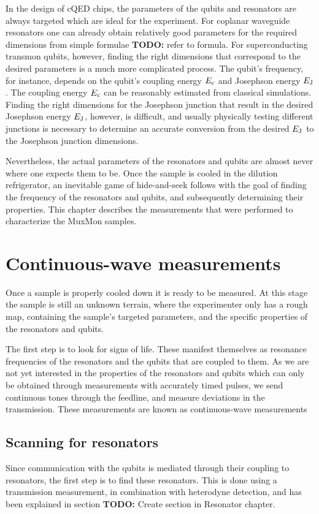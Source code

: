     In the design of cQED chips, the parameters of the qubits and resonators are always targeted which are ideal for the experiment.
    For coplanar waveguide resonators one can already obtain relatively good parameters for the required dimensions from simple formulae \textbf{TODO:} refer to formula.
    For superconducting transmon qubits, however, finding the right dimensions that correspond to the desired parameters is a much more complicated process.
    The qubit's frequency, for instance, depends on the qubit's coupling energy $E_\text{c}$ and Josephson energy $E_\text{J}$. The coupling energy $E_\text{c}$ can be reasonably estimated from classical simulations. Finding the right dimensions for the Josephson junction that result in the desired Josephson energy $E_\text{J}$, however, is difficult, and usually physically testing different junctions is necessary to determine an accurate conversion from the desired $E_\text{J}$ to the Josephson junction dimensions.

    Nevertheless, the actual parameters of the resonators and qubits are almost never where one expects them to be. Once the sample is cooled in the dilution refrigerator, an inevitable game of hide-and-seek follows with the goal of finding the frequency of the resonators and qubits, and subsequently determining their properties. This chapter describes the measurements that were performed to characterize the MuxMon samples.

    \section{Continuous-wave measurements}

      Once a sample is properly cooled down it is ready to be measured. At this stage the sample is still an unknown terrain, where the experimenter only has a rough map, containing the sample's targeted parameters, and the specific properties of the resonators and qubits.

      The first step is to look for signs of life. These manifest themselves as resonance frequencies of the resonators and the qubits that are coupled to them. As we are not yet interested in the properties of the resonators and qubits which can only be obtained through measurements with accurately timed pulses, we send continuous tones through the feedline, and measure deviations in the transmission. These measurements are known as continuous-wave measurements

      \subsection{Scanning for resonators}
        \label{sec:resonator-scan}
        Since communication with the qubits is mediated through their coupling to resonators, the first step is to find these resonators. This is done using a transmission measurement, in combination with heterodyne detection, and has been explained in section \textbf{TODO:} Create section in Resonator chapter.

